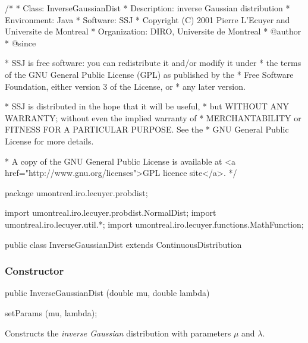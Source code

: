 \begin{code}
\begin{hide}
/*
 * Class:        InverseGaussianDist
 * Description:  inverse Gaussian distribution
 * Environment:  Java
 * Software:     SSJ 
 * Copyright (C) 2001  Pierre L'Ecuyer and Universite de Montreal
 * Organization: DIRO, Universite de Montreal
 * @author       
 * @since

 * SSJ is free software: you can redistribute it and/or modify it under
 * the terms of the GNU General Public License (GPL) as published by the
 * Free Software Foundation, either version 3 of the License, or
 * any later version.

 * SSJ is distributed in the hope that it will be useful,
 * but WITHOUT ANY WARRANTY; without even the implied warranty of
 * MERCHANTABILITY or FITNESS FOR A PARTICULAR PURPOSE.  See the
 * GNU General Public License for more details.

 * A copy of the GNU General Public License is available at
   <a href="http://www.gnu.org/licenses">GPL licence site</a>.
 */
\end{hide}
package umontreal.iro.lecuyer.probdist;
\begin{hide}
import umontreal.iro.lecuyer.probdist.NormalDist;
import umontreal.iro.lecuyer.util.*;
import umontreal.iro.lecuyer.functions.MathFunction;
 \end{hide}

public class InverseGaussianDist extends ContinuousDistribution\begin{hide} {
   protected double mu;
   protected double lambda;

   private static class Function implements MathFunction {
      protected double mu;
      protected double lambda;
      protected double u;

      public Function (double mu, double lambda, double u) {
         this.mu = mu;
         this.lambda = lambda;
         this.u = u;
      }

      public double evaluate (double x) {
         return u - cdf(mu, lambda, x);
      }
   }
\end{hide}
\end{code}
\subsubsection* {Constructor}

\begin{code}

   public InverseGaussianDist (double mu, double lambda)\begin{hide} {
      setParams (mu, lambda);
   }\end{hide}
\end{code}
\begin{tabb}
   Constructs the {\em inverse Gaussian\/} distribution with parameters $\mu$ and $\lambda$.
\end{tabb}

